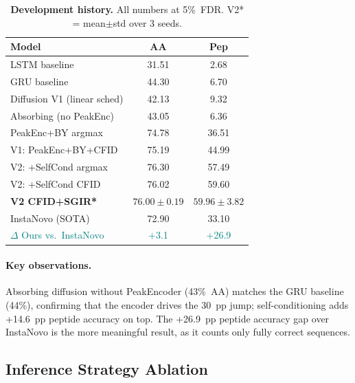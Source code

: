 \documentclass{article}
\begin{document}
\begin{table}[t]
  \centering
  \caption{
    \textbf{Development history.}
    All numbers at 5\%~FDR.
    V2* = mean$\pm$std over 3 seeds.
  }
  \label{tab:main}
  \setlength{\tabcolsep}{4pt}
  \small
  \begin{tabular}{lcc}
    \toprule
    Model & AA & Pep \\
    \midrule
    LSTM baseline               & 31.51 & 2.68  \\
    GRU baseline                & 44.30 & 6.70  \\
    Diffusion V1 (linear sched) & 42.13 & 9.32  \\
    Absorbing (no PeakEnc)      & 43.05 & 6.36  \\
    \midrule
    PeakEnc+BY argmax           & 74.78 & 36.51 \\
    V1: PeakEnc+BY+CFID         & 75.19 & 44.99 \\
    \midrule
    V2: +SelfCond argmax        & 76.30 & 57.49 \\
    V2: +SelfCond CFID          & 76.02 & 59.60 \\
    \rowcolor{green!10}
    \textbf{V2 CFID+SGIR*}      & $76.00{\pm}0.19$ & $59.96{\pm}3.82$ \\
    \midrule
    InstaNovo (SOTA)            & 72.90 & 33.10 \\
    \textcolor{teal}{$\Delta$ Ours vs.\ InstaNovo} & \textcolor{teal}{+3.1} & \textcolor{teal}{+26.9} \\
    \bottomrule
  \end{tabular}
\end{table}

\paragraph{Key observations.}
Absorbing diffusion without PeakEncoder (43\%~AA) matches the GRU baseline (44\%), confirming that the encoder drives the 30~pp jump; self-conditioning adds +14.6~pp peptide accuracy on top.
The +26.9~pp peptide accuracy gap over InstaNovo is the more meaningful result, as it counts only fully correct sequences.

\subsection{Inference Strategy Ablation}
\end{document}

